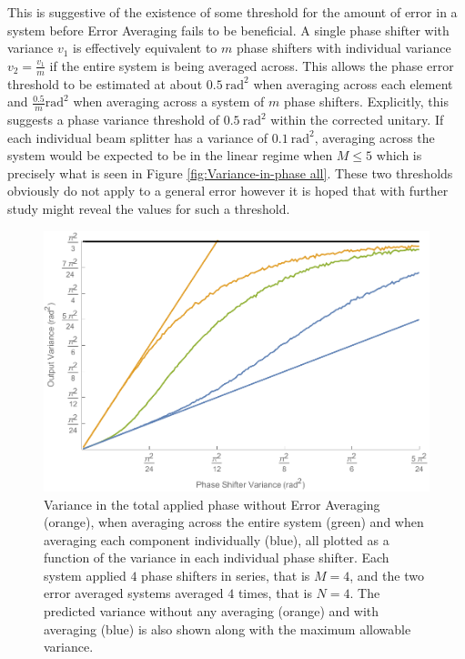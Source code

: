 \documentclass[aps,pra,twocolumn,superscriptaddress,numerical,floatfix]{revtex4-1}
\begin{document}
This is suggestive of the existence of some threshold for the amount of error in a system before Error Averaging fails to be beneficial. A single phase shifter with variance $v_{1}$ is effectively equivalent to $m$ phase shifters with individual variance $v_{2}=\frac{v_{1}}{m}$ if the entire system is being averaged across. This allows the phase error threshold to be estimated at about $0.5\ \textrm{rad}^{2}$ when averaging across each element and $\frac{0.5}{m}\textrm{rad}^{2}$ when averaging across a system of $m$ phase shifters. Explicitly, this suggests a phase variance threshold of $0.5\ \textrm{rad}^{2}$ within the corrected unitary. If each individual beam splitter has a variance of $0.1\ \textrm{rad}^{2}$, averaging across the system would be expected to be in the linear regime when $M\le5$ which is precisely what is seen in Figure \ref{fig:Variance-in-phase all}. These two thresholds obviously do not apply to a general error however it is hoped that with further study might reveal the values for such a threshold.
\begin{figure}
\centerline{\includegraphics[width=\columnwidth]{variance(variance).pdf}}
\caption{Variance in the total applied phase without Error Averaging (orange), when averaging across the entire system (green) and when averaging each component individually (blue), all plotted as a function of the variance in each individual phase shifter. Each system applied $4$ phase shifters in series, that is $M=4$, and the two error averaged systems averaged $4$ times, that is $N=4$. The predicted variance without any averaging (orange) and with averaging (blue) is also shown along with the maximum allowable variance. \label{fig:Variance(veriance)}}
\end{figure}
\end{document}
